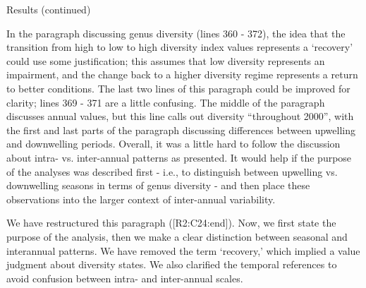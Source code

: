 \documentclass[12pt,english]{reviewresponse}
\begin{document}
\begin{revcomment}
	Results (continued)

    In the paragraph discussing genus diversity (lines 360 - 372), the idea that the transition from high to low to high diversity index values represents a ‘recovery’ could use some justification; this assumes that low diversity represents an impairment, and the change back to a higher diversity regime represents a return to better conditions. The last two lines of this paragraph could be improved for clarity; lines 369 - 371 are a little confusing. The middle of the paragraph discusses annual values, but this line calls out diversity “throughout 2000”, with the first and last parts of the paragraph discussing differences between upwelling and downwelling periods. Overall, it was a little hard to follow the discussion about intra- vs. inter-annual patterns as presented. It would help if the purpose of the analyses was described first - i.e., to distinguish between upwelling vs. downwelling seasons in terms of genus diversity - and then place these observations into the larger context of inter-annual variability.
\end{revcomment}
\begin{revresponse}
    We have restructured this paragraph ([R2:C24:end]). Now, we first state the purpose of the analysis, then we make a clear distinction between seasonal and interannual patterns. We have removed the term `recovery,' which implied a value judgment about diversity states. We also clarified the temporal references to avoid confusion between intra- and inter-annual scales.
\end{revresponse}
\end{document}
